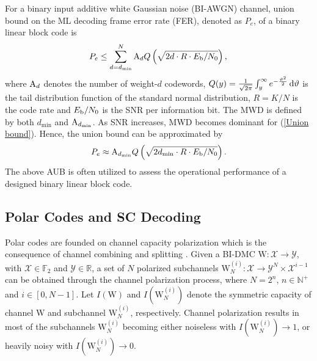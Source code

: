 \documentclass[12pt, draftclsnofoot, peerreview, onecolumn]{IEEEtran}
\theoremstyle{noparent}
\begin{document}
For a binary input additive white Gaussian noise (BI-AWGN) channel, 
union bound \cite{ShuLin2004ErrorControlCoding} on the ML decoding frame error rate (FER),
denoted as $P_e$,
of a binary linear block code is
\begin{equation}
    P_e \leq \sum_{d=d_{\min }}^N {\rm A}_d Q\left(\sqrt{2 d \cdot R \cdot E_{\rm b} / N_0}\right), \\
    \label{Union bound}
\end{equation}
where ${\rm A}_d$ denotes the number of weight-$d$ codewords, 
$Q(y)=\frac{1}{\sqrt{2\pi}} \int_{y}^{\infty} e^{-\frac{\vartheta^2}{2}}\,{\rm d}\vartheta$ 
is the tail distribution function of the standard normal distribution, 
$R={K}/{N}$ is the code rate
and $E_{\rm b} / N_0$ is the SNR per information bit.   
The MWD is defined by both $d_{\min}$ and ${\rm A}_{d_{\min}}$.
As SNR increases, MWD becomes dominant for (\ref{Union bound}).
Hence, the union bound can be approximated by 
\begin{equation}
    P_e \approx {\rm A}_{d_{\min}} Q\left(\sqrt{2 d_{\min} \cdot R \cdot E_{\rm b} / N_0}\right). \\
    \label{AUB}
\end{equation}
The above AUB is often utilized to assess the operational performance of a designed binary linear block code.


\subsection{Polar Codes and SC Decoding}
Polar codes are founded on channel capacity polarization
which is the consequence of channel combining and splitting \cite{Arikan2009ChannelPolarizationMethod}. 
Given a BI-DMC $\mathrm{W}: \mathcal{X} \rightarrow \mathcal{Y}$, 
with $\mathcal{X} \in \mathbb{F}_2$ and $\mathcal{Y} \in \mathbb{R}$,
a set of $N$ polarized subchannels 
{$\mathrm{W}_{N}^{(i)}: \mathcal{X} \rightarrow \mathcal{Y}^{N} \times \mathcal{X}^{i-1}$} can be obtained through the channel polarization process, where $N=2^{n}$, $n \in \mathbb{N}^{+}$ and $i \in [0,N-1]$.
Let $I(\mathrm{W})$ and $I(\mathrm{W}_{N}^{(i)})$ denote the symmetric capacity of
channel $\mathrm{W}$ and subchannel $\mathrm{W}_{N}^{(i)}$, respectively.
{Channel polarization results in most of the
subchannels $\mathrm{W}_{N}^{(i)}$ becoming either noiseless with $I(\mathrm{W}_{N}^{(i)}) \rightarrow 1$, 
or heavily noisy with $I(\mathrm{W}_{N}^{(i)}) \rightarrow 0$. }
\end{document}
